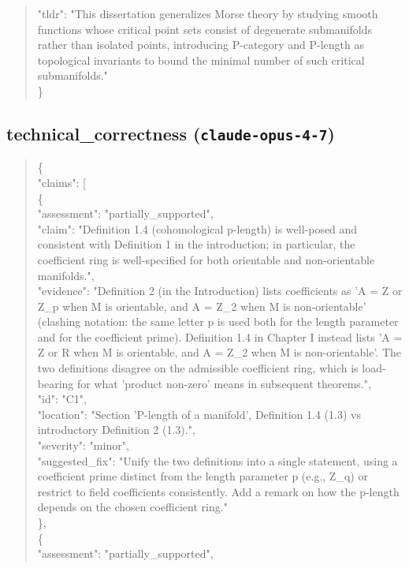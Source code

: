 \documentclass[11pt]{article}
\begin{document}
\begin{quote}
  "tldr": "This dissertation generalizes Morse theory by studying smooth functions whose critical point sets consist of degenerate submanifolds rather than isolated points, introducing P-category and P-length as topological invariants to bound the minimal number of such critical submanifolds."\\
\}\\
\end{quote}

\subsection*{technical\_correctness (\texttt{claude-opus-4-7})}
\begin{quote}\small\ttfamily\raggedright
\{\\
  "claims": [\\
    \{\\
      "assessment": "partially\_supported",\\
      "claim": "Definition 1.4 (cohomological p-length) is well-posed and consistent with Definition 1 in the introduction; in particular, the coefficient ring is well-specified for both orientable and non-orientable manifolds.",\\
      "evidence": "Definition 2 (in the Introduction) lists coefficients as 'A = Z or Z\_p when M is orientable, and A = Z\_2 when M is non-orientable' (clashing notation: the same letter p is used both for the length parameter and for the coefficient prime). Definition 1.4 in Chapter I instead lists 'A = Z or R when M is orientable, and A = Z\_2 when M is non-orientable'. The two definitions disagree on the admissible coefficient ring, which is load-bearing for what 'product non-zero' means in subsequent theorems.",\\
      "id": "C1",\\
      "location": "Section 'P-length of a manifold', Definition 1.4 (1.3) vs introductory Definition 2 (1.3).",\\
      "severity": "minor",\\
      "suggested\_fix": "Unify the two definitions into a single statement, using a coefficient prime distinct from the length parameter p (e.g., Z\_q) or restrict to field coefficients consistently. Add a remark on how the p-length depends on the chosen coefficient ring."\\
    \},\\
    \{\\
      "assessment": "partially\_supported",\\

\end{quote}
\end{document}
